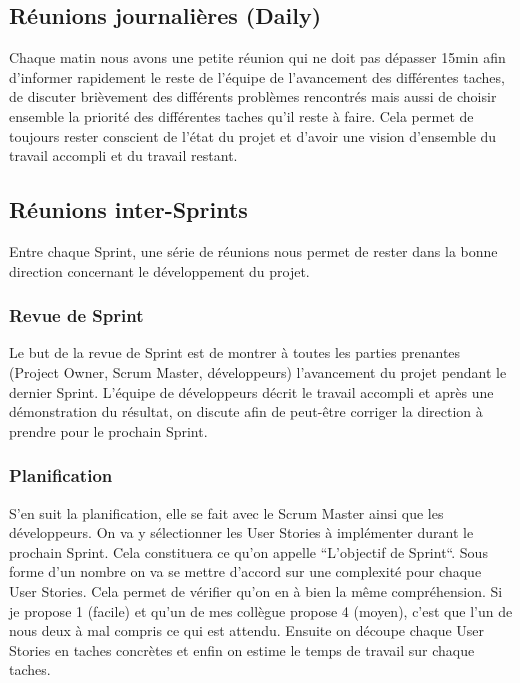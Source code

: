 \documentclass[12pt, a4paper]{report}
\begin{document}
        \subsection{Réunions journalières (Daily)}
            Chaque matin nous avons une petite réunion qui ne doit pas dépasser 15min afin d'informer rapidement le reste de l'équipe de l'avancement des différentes taches, de discuter brièvement des différents problèmes rencontrés mais aussi de choisir ensemble la priorité des différentes taches qu'il reste à faire.\newline
            Cela permet de toujours rester conscient de l'état du projet et d'avoir une vision d'ensemble du travail accompli et du travail restant.
        \subsection{Réunions inter-Sprints}
            Entre chaque Sprint, une série de réunions nous permet de rester dans la bonne direction concernant le développement du projet.
            \subsubsection{Revue de Sprint}
                Le but de la revue de Sprint est de montrer à toutes les parties prenantes (Project Owner, Scrum Master, développeurs) l'avancement du projet pendant le dernier Sprint.\newline
                L'équipe de développeurs décrit le travail accompli et après une démonstration du résultat, on discute afin de peut-être corriger la direction à prendre pour le prochain Sprint.
            \subsubsection{Planification}
                S'en suit la planification, elle se fait avec le Scrum Master ainsi que les développeurs.\newline
                On va y sélectionner les User Stories à implémenter durant le prochain Sprint. Cela constituera ce qu'on appelle ``L'objectif de Sprint``.\newline
                Sous forme d'un nombre on va se mettre d'accord sur une complexité pour chaque User Stories. Cela permet de vérifier qu'on en à bien la même compréhension. Si je propose 1 (facile) et qu'un de mes collègue propose 4 (moyen), c'est que l'un de nous deux à mal compris ce qui est attendu.\newline
                Ensuite on découpe chaque User Stories en taches concrètes et enfin on estime le temps de travail sur chaque taches.
\end{document}
